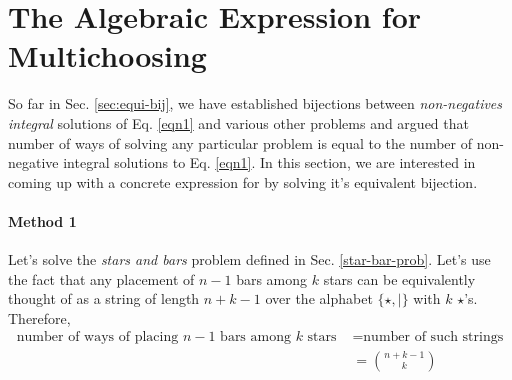 \section{The Algebraic Expression for Multichoosing}\label{alg-expr}
So far in Sec. \ref{sec:equi-bij}, we have established bijections between \emph{non-negatives integral} solutions of Eq. \ref{eqn1} and various other problems and argued that number of ways of solving any particular problem is equal to the number of non-negative integral solutions to Eq. \ref{eqn1}. In this section, we are interested in coming up with a concrete expression for  by solving it's equivalent bijection.

\paragraph{Method 1} Let's solve the \emph{stars and bars} problem defined in Sec. \ref{star-bar-prob}. Let's use the fact that any placement of $n-1$ bars among $k$ stars can be equivalently thought of as a string of length $n+k-1$ over the alphabet $\{\star,|\}$ with $k$ $\star$'s. Therefore, \begin{align*}
    \textrm{number of ways of placing } n-1 \textrm{ bars among } k \textrm{ stars } &= \textrm{number of such strings}\\
    &= \binom{n+k-1}{k}
\end{align*}

